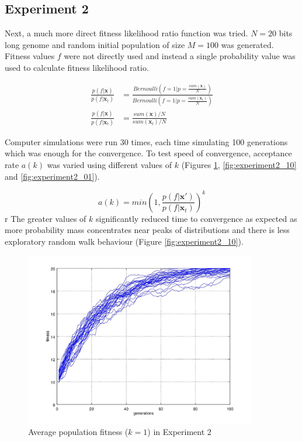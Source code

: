 \documentclass{article}
\begin{document}
\subsection{Experiment 2}

Next, a much more direct fitness likelihood ratio function was tried. $N=20$ bits long genome and random initial population of size $M=100$ was generated. Fitness values $f$ were not directly used and instead a single probability value was used to calculate fitness likelihood ratio.


\begin{equation}
  \begin{aligned}
    \frac{p(f|\mathbf{x})}{p(f|\mathbf{x}_{t})} &= \frac{Bernoulli(f=1|p=\frac{sum(\mathbf{x})}{N})}{Bernoulli(f=1|p=\frac{sum(\mathbf{x}_{t})}{N})} \\
    \frac{p(f|\mathbf{x})}{p(f|\mathbf{x}_{t})} &= \frac{sum(\mathbf{x})/N}{sum(\mathbf{x}_{t})/N}
  \end{aligned}
\end{equation}

Computer simulations were run 30 times, each time simulating 100 generations which was enough for the convergence. To test speed of convergence, acceptance rate $a(k)$ was varied using different values of $k$ (Figures \ref{fig:experiment2_1}, \ref{fig:experiment2_10} and \ref{fig:experiment2_01}).

\begin{equation}
  \label{mcmcsampling3}
  a(k) = min(1, \frac{p(f|\mathbf{x}')}{p(f|\mathbf{x}_t)})^{k}
\end{equation}
r
The greater values of $k$ significantly reduced time to convergence as expected as more probability mass concentrates near peaks of distributions and there is less exploratory random walk behaviour (Figure \ref{fig:experiment2_10}).

\begin{figure}

\centering
\includegraphics[keepaspectratio,width=0.9\textwidth]{experiment2figure2_1.jpg}

\caption{Average population fitness ($k = 1$) in Experiment 2}

\label{fig:experiment2_1}

\end{figure}
\end{document}
